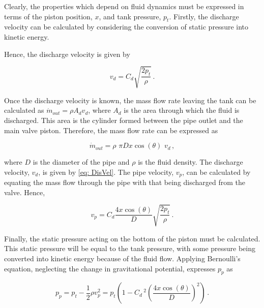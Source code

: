 Clearly, the properties which depend on fluid dynamics must be expressed in terms of the piston position, $x$, and tank pressure, $p_t$. Firstly, the discharge velocity can be calculated by considering the conversion of static pressure into kinetic energy.

Hence, the discharge velocity is given by

\begin{equation} \label{eq: DisVel}
    v_d = C_d \sqrt{\frac{2 p_t}{\rho}} \, .
\end{equation}

Once the discharge velocity is known, the mass flow rate leaving the tank can be calculated as $\dot{m}_{out} = \rho A_d v_d$, where $A_d$ is the area through which the fluid is discharged. This area is the cylinder formed between the pipe outlet and the main valve piston. Therefore, the mass flow rate can be expressed as

\begin{equation*}
    \dot{m}_{out} =
    \rho \,\, \pi D x \cos(\theta) \,\, v_d \, ,
\end{equation*}

where $D$ is the diameter of the pipe and $\rho$ is the fluid density. The discharge velocity, $v_d$, is given by \cref{eq: DisVel}. The pipe velocity, $v_p$, can be calculated by equating the mass flow through the pipe with that being discharged from the valve. Hence,

\begin{equation*}
    v_p = C_d \frac{4 x \cos(\theta)}{D} \sqrt{\frac{2 p_t}{\rho}} \, .
\end{equation*}

Finally, the static pressure acting on the bottom of the piston must be calculated. This static pressure will be equal to the tank pressure, with some pressure being converted into kinetic energy because of the fluid flow. Applying Bernoulli's equation, neglecting the change in gravitational potential, expresses $p_p$ as

\begin{equation*}
    p_p = p_t - \frac{1}{2} \rho v_p ^2 =
    p_t \left( 1 - C_d \,^2 \left( \frac{4 x \cos(\theta)}{D} \right)^2 \right) \, .
\end{equation*}

